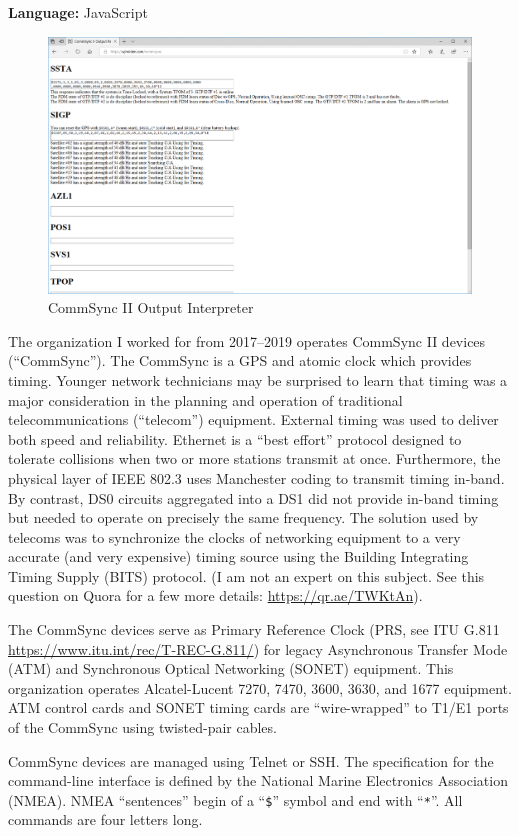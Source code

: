 \documentclass[12pt]{article}
\begin{document}
\noindent \textbf{Language:} JavaScript

\begin{figure}[h]
\centering
\includegraphics[width=.80\textwidth]{CommSync}
\caption{CommSync II Output Interpreter}
\label{fig:CommSync}
\end{figure}

The organization I worked for from 2017--2019 operates CommSync II devices (``CommSync'').
The CommSync is a GPS and atomic clock which provides timing.
Younger network technicians may be surprised to learn that timing was a major consideration in the planning and operation of traditional telecommunications (``telecom'') equipment.
External timing was used to deliver both speed and reliability.
Ethernet is a ``best effort'' protocol designed to tolerate collisions when two or more stations transmit at once.
Furthermore, the physical layer of IEEE 802.3 uses Manchester coding to transmit timing in-band.
By contrast, DS0 circuits aggregated into a DS1 did not provide in-band timing but needed to operate on precisely the same frequency.
The solution used by telecoms was to synchronize the clocks of networking equipment to a very accurate (and very expensive) timing source using the Building Integrating Timing Supply (BITS) protocol.
(I am not an expert on this subject. See this question on Quora for a few more details: \url{https://qr.ae/TWKtAn}).

The CommSync devices serve as Primary Reference Clock (PRS, see ITU G.811 \url{https://www.itu.int/rec/T-REC-G.811/}) for legacy Asynchronous Transfer Mode (ATM) and Synchronous Optical Networking (SONET) equipment.
This organization operates Alcatel-Lucent 7270, 7470, 3600, 3630, and 1677 equipment.
ATM control cards and SONET timing cards are ``wire-wrapped'' to T1/E1 ports of the CommSync using twisted-pair cables.

CommSync devices are managed using Telnet or SSH.
The specification for the command-line interface is defined by the National Marine Electronics Association (NMEA).
NMEA ``sentences'' begin of a ``\texttt{\$}'' symbol and end with ``\texttt{*}''.
All commands are four letters long.
\end{document}
